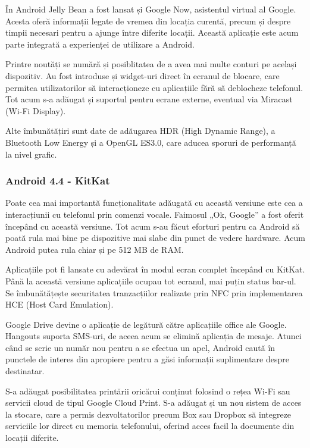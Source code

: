 \documentclass[12pt,a4paper]{article}
\begin{document}
	În Android Jelly Bean a fost lansat și Google Now, asistentul virtual al Google. Acesta oferă informații legate de vremea din locația curentă, precum și despre timpii necesari pentru a ajunge între diferite locații. Această aplicație este acum parte integrată a experienței de utilizare a Android.

	Printre noutăți se numără și posiblitatea de a avea mai multe conturi pe același dispozitiv. Au fost introduse și widget-uri direct în ecranul de blocare, care permitea utilizatorilor să interacționeze cu aplicațiile fără să deblocheze telefonul. Tot acum s-a adăugat și suportul pentru ecrane externe, eventual via Miracast (Wi-Fi Display).

	Alte îmbunătățiri sunt date de adăugarea HDR (High Dynamic Range), a Bluetooth Low Energy și a OpenGL ES3.0, care aducea sporuri de performanță la nivel grafic.


\subsubsection{Android 4.4 - KitKat}
Poate cea mai importantă funcționalitate adăugată cu această versiune este cea a interacțiunii cu telefonul prin comenzi vocale. Faimosul „Ok, Google” a fost oferit începând cu această versiune. Tot acum s-au făcut eforturi pentru ca Android să poată rula mai bine pe dispozitive mai slabe din punct de vedere hardware. Acum Android putea rula chiar și pe 512 MB de RAM.

	Aplicațiile pot fi lansate cu adevărat în modul ecran complet începând cu KitKat. Până la această versiune aplicațiile ocupau tot ecranul, mai puțin status bar-ul. Se îmbunătățește securitatea tranzacțiilor realizate prin NFC prin implementarea  HCE (Host Card Emulation).

	Google Drive devine o aplicație de legătură către aplicațiile office ale Google. Hangouts suporta SMS-uri, de aceea acum se elimină aplicația de mesaje. Atunci când se scrie un număr nou pentru a se efectua un apel, Android caută în punctele de interes din apropiere pentru a găsi informații suplimentare despre destinatar.

	S-a adăugat posibilitatea printării oricărui conținut folosind o rețea Wi-Fi sau servicii cloud de tipul Google Cloud Print. S-a adăugat și un nou sistem de acces la stocare, care a permis dezvoltatorilor precum Box sau Dropbox să integreze serviciile lor direct cu memoria telefonului, oferind acces facil la documente din locații diferite.
\end{document}

